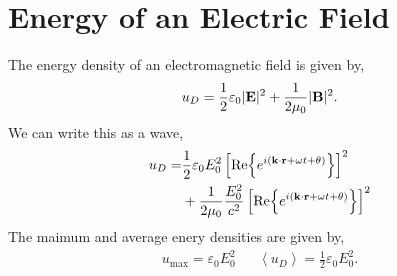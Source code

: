 \documentclass{book}
\begin{document}
\section{Energy of an Electric Field}
The energy density of an electromagnetic field is given by,
\begin{equation}
	u_D = \frac{1}{2}\varepsilon_0 |\vb{E}|^2 + \frac{1}{2\mu_0}|\vb{B}|^2.
\end{equation}
We can write this as a wave,
\begin{equation}
	\begin{split}
	u_D =& \frac{1}{2}\varepsilon_0 E_0^2 \left[\Re{e^{i(\vb{k}\cdot\vb{r} + \omega t + \theta)}}\right]^2 \\
	& + \frac{1}{2\mu_0}\frac{E_0^2}{c^2}\left[\Re{e^{i(\vb{k}\cdot\vb{r}+\omega t + \theta)}}\right]^2
	\end{split}
\end{equation}
The maimum and average enery densities are given by,
\begin{align}
	u_{\text{max}} = \varepsilon_0E_0^2 && \left<u_D\right> = \frac{1}{2} \varepsilon_0E_0^2.
\end{align}
\end{document}
